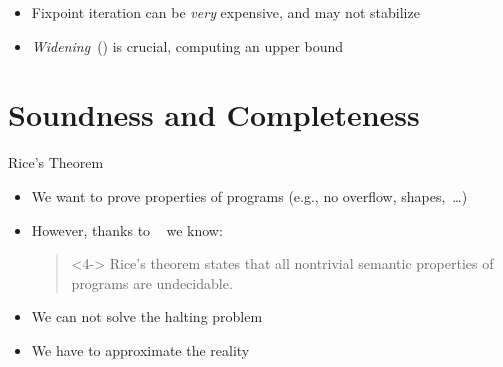 \documentclass[
   aspectratio=169, %
   10pt, %
   uniqueslidenumber,
   professionalfonts
]{beamer}
\begin{document}
\begin{frame}[fragile]{\insertsubsection}
\begin{onlyenv}
\end{onlyenv}
\begin{itemize}
   \itemsep6.5pt
   \item<13-> Fixpoint iteration can be \textit{very} expensive, and may not stabilize %
   \item<14-> \textit{Widening}~(\absexpr{\widen}) is crucial, computing an upper bound
\end{itemize}
\end{frame}

\newsavebox\pinguA
\savebox\pinguA{\tikz{\pingu[wings grab,eyes sad,cup=red,wool hat]}}
\section{Soundness and Completeness}
\begin{frame}{Rice's Theorem}
   \begin{itemize}
      \itemsep12pt
      \item<2-> We want to prove properties of programs (e.g., no overflow, shapes,~\ldots)
      \item<3-> However, thanks to \citeauthor{rice1953classes}~\cite{rice1953classes} we know:\smallskip\\
      \begin{quote}<4->
         Rice's theorem states that all nontrivial semantic properties of programs are undecidable.~\cite[100]{cousout2021principles}
      \end{quote}
      \item<5-> We can not solve the halting problem
      \item<6-> We have to approximate the reality
   \end{itemize}
\end{frame}
\end{document}
